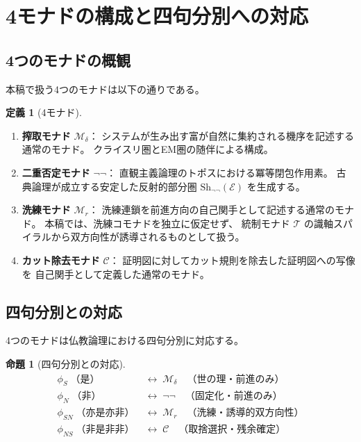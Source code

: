 \documentclass[11pt,a4paper]{article}
\newcommand{\Mr}{\mathcal{M}_r}
\newcommand{\Md}{\mathcal{M}_\delta}
\newcommand{\Mnn}{\neg\neg}
\newcommand{\MC}{\mathcal{C}}
\newcommand{\MT}{\mathcal{T}}
\theoremstyle{definition}
\newtheorem{definition}{定義}[section]
\newtheorem{proposition}{命題}[section]
\begin{document}
\section{4モナドの構成と四句分別への対応}

\subsection{4つのモナドの概観}

本稿で扱う4つのモナドは以下の通りである。

\begin{definition}[4モナド]
\begin{enumerate}
  \item \textbf{搾取モナド} $\Md$：
    システムが生み出す富が自然に集約される機序を記述する通常のモナド。
    クライスリ圏とEM圏の随伴による構成。
  \item \textbf{二重否定モナド} $\Mnn$：
    直観主義論理のトポスにおける冪等閉包作用素。
    古典論理が成立する安定した反射的部分圏 $\mathrm{Sh}_{\Mnn}(\mathcal{E})$ を生成する。
  \item \textbf{洗練モナド} $\Mr$：
    洗練連鎖を前進方向の自己関手として記述する通常のモナド。
    本稿では、洗練コモナドを独立に仮定せず、
    統制モナド $\MT$ の識軸スパイラルから双方向性が誘導されるものとして扱う。
  \item \textbf{カット除去モナド} $\MC$：
    証明図に対してカット規則を除去した証明図への写像を
    自己関手として定義した通常のモナド。
\end{enumerate}
\end{definition}

\subsection{四句分別との対応}

4つのモナドは仏教論理における四句分別に対応する。

\begin{proposition}[四句分別との対応]
\begin{align}
\phi_S\;\text{（是）} &\;\longleftrightarrow\; \Md
  \quad\text{（世の理・前進のみ）} \\
\phi_N\;\text{（非）} &\;\longleftrightarrow\; \Mnn
  \quad\text{（固定化・前進のみ）} \\
\phi_{SN}\;\text{（亦是亦非）} &\;\longleftrightarrow\; \Mr
  \quad\text{（洗練・誘導的双方向性）} \\
\phi_{NS}\;\text{（非是非非）} &\;\longleftrightarrow\; \MC
  \quad\text{（取捨選択・残余確定）}
\end{align}
\end{proposition}
\end{document}
